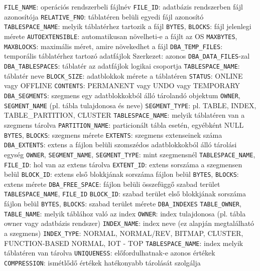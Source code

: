 \documentclass[12pt,a4paper]{article}
\begin{document}
\begin{outline}
		\2 \texttt{FILE\_NAME}: operációs rendszerbeli fájlnév
		\2 \texttt{FILE\_ID}: adatbázis rendszerben fájl azonosítója
		\2 \texttt{RELATIVE\_FNO}: táblatéren belüli egyedi fájl azonosító
		\2 \texttt{TABLESPACE\_NAME}: melyik táblatérhez tartozik a fájl
		\2 \texttt{BYTES}, \texttt{BLOCKS}: fájl jelenlegi mérete
		\2 \texttt{AUTOEXTENSIBLE}: automatikusan növelheti-e a fájlt az OS
		\2 \texttt{MAXBYTES}, \texttt{MAXBLOCKS}: maximális méret, amire növekedhet a fájl
	\1 \texttt{DBA\_TEMP\_FILES}: temporális táblatérhez tartozó adatfájlok
		\2 Szerkezet: azonos \texttt{DBA\_DATA\_FILES}-zal
	\1 \texttt{DBA\_TABLESPACES}: táblatér az adatfájlok logikai csoportja
		\2 \texttt{TABLESPACE\_NAME}: táblatér neve
		\2 \texttt{BLOCK\_SIZE}: adatblokkok mérete a táblatéren
		\2 \texttt{STATUS}: ONLINE vagy OFFLINE
		\2 \texttt{CONTENTS}: PERMANENT vagy UNDO vagy TEMPORARY
	\1 \texttt{DBA\_SEGMENTS}: szegmens egy adatblokkokból álló tárolandó objektum
		\2 \texttt{OWNER}, \texttt{SEGMENT\_NAME} (pl. tábla tulajdonosa és neve)
		\2 \texttt{SEGMENT\_TYPE}: pl. TABLE, INDEX, TABLE\_PARTITION, CLUSTER
		\2 \texttt{TABLESPACE\_NAME}: melyik táblatéren van a szegmens tárolva
		\2 \texttt{PARTITION\_NAME}: particionált tábla esetén, egyébként NULL
		\2 \texttt{BYTES}, \texttt{BLOCKS}: szegmens mérete
		\2 \texttt{EXTENTS}: szegmens extenseinek száma
	\1 \texttt{DBA\_EXTENTS}: extens a fájlon belüli szomszédos adatblokkokból álló tárolási egység
		\2 \texttt{OWNER}, \texttt{SEGMENT\_NAME}, \texttt{SEGMENT\_TYPE}: mint szegmensnél
		\2 \texttt{TABLESPACE\_NAME}, \texttt{FILE\_ID}: hol van az extens tárolva
		\2 \texttt{EXTENT\_ID}: extens sorszáma a szegmensen belül
		\2 \texttt{BLOCK\_ID}: extens első blokkjának sorszáma fájlon belül
		\2 \texttt{BYTES}, \texttt{BLOCKS}: extens mérete
\pagebreak
	\1 \texttt{DBA\_FREE\_SPACE}: fájlon belüli összefüggő szabad terület
		\2 \texttt{TABLESPACE\_NAME}, \texttt{FILE\_ID}
		\2 \texttt{BLOCK\_ID}: szabad terület első blokkjának sorszáma fájlon belül
		\2 \texttt{BYTES}, \texttt{BLOCKS}: szabad terület mérete
	\1 \texttt{DBA\_INDEXES}
		\2 \texttt{TABLE\_OWNER}, \texttt{TABLE\_NAME}: melyik táblához való az index
		\2 \texttt{OWNER}: index tulajdonosa (pl. tábla owner vagy adatbázis rendszer)
		\2 \texttt{INDEX\_NAME}: index neve (ez alapján megtalálható a szegmens)
		\2 \texttt{INDEX\_TYPE}: NORMAL, NORMAL/REV, BITMAP, CLUSTER,\\
		FUNCTION-BASED NORMAL, IOT - TOP
		\2 \texttt{TABLESPACE\_NAME}: index melyik táblatéren van tárolva
		\2 \texttt{UNIQUENESS}: előfordulhatnak-e azonos értékek
		\2 \texttt{COMPRESSION}: ismétlődő értékek hatékonyabb tárolását szolgálja

\end{outline}
\end{document}

